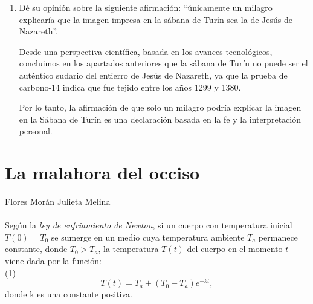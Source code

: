 \documentclass[12pt]{article}
\begin{document}
\begin{enumerate}
\item Dé su opinión sobre la siguiente afirmación: “únicamente un milagro explicaría que la imagen impresa en la sábana de Turín sea la de Jesús de Nazareth”.

Desde una perspectiva científica, basada en los avances tecnológicos, concluimos en los apartados anteriores que la sábana de Turín no puede ser el auténtico sudario del entierro de Jesús de Nazareth, ya que la prueba de carbono-14 indica que fue tejido entre los años 1299 y 1380.

Por lo tanto, la afirmación de que solo un milagro podría explicar la imagen en la Sábana de Turín es una declaración basada en la fe y la interpretación personal.

\end{enumerate}



\section{La malahora del occiso}
Flores Morán Julieta Melina\\
\\
Según la \textit{ley de enfriamiento de Newton}, si un cuerpo con temperatura inicial $T (0) = T_0$ se
sumerge en un medio cuya temperatura ambiente $T_a$ permanece constante, donde $T_0 > T_a$, la
temperatura $T(t)$ del cuerpo en el momento $t$ viene dada por la función: \\
(1)\\
\[
T(t)= T_a + (T_0-T_a)e^{-kt},
\]
donde k es una constante positiva.\\ 
\end{document}
